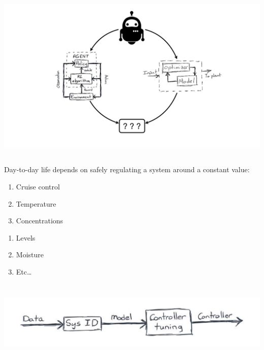 \documentclass[
  letterpaper,
  DIV=11,
  numbers=noendperiod,
  oneside]{scrartcl}
\providecommand{\tightlist}{%
  \setlength{\itemsep}{0pt}\setlength{\parskip}{0pt}}\usepackage{longtable,booktabs,array}
\begin{document}
\begin{center}
\includegraphics{figs/4_intro_rlmpc.png}
\end{center}


\subsection{}\label{section-1}

Day-to-day life depends on safely regulating a system around a constant
value:

\begin{enumerate}
\def\labelenumi{\arabic{enumi}.}
\tightlist
\item
  Cruise control
\item
  Temperature
\item
  Concentrations
\end{enumerate}

\begin{enumerate}
\def\labelenumi{\arabic{enumi}.}
\setcounter{enumi}{3}
\tightlist
\item
  Levels
\item
  Moisture
\item
  Etc\ldots{}
\end{enumerate}

\begin{center}
\includegraphics[width=\textwidth,height=1.5625in]{figs/sysid.png}
\end{center}
\end{document}
